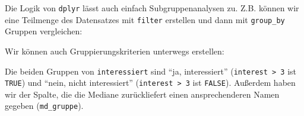 \documentclass[12pt,ngerman,]{book}
\makeatletter
\newenvironment{Shaded}{\begin{snugshade}}{\end{snugshade}}
\newcommand{\KeywordTok}[1]{\textcolor[rgb]{0.13,0.29,0.53}{\textbf{#1}}}
\newcommand{\DataTypeTok}[1]{\textcolor[rgb]{0.13,0.29,0.53}{#1}}
\newcommand{\DecValTok}[1]{\textcolor[rgb]{0.00,0.00,0.81}{#1}}
\newcommand{\StringTok}[1]{\textcolor[rgb]{0.31,0.60,0.02}{#1}}
\newcommand{\CommentTok}[1]{\textcolor[rgb]{0.56,0.35,0.01}{\textit{#1}}}
\newcommand{\OtherTok}[1]{\textcolor[rgb]{0.56,0.35,0.01}{#1}}
\newcommand{\OperatorTok}[1]{\textcolor[rgb]{0.81,0.36,0.00}{\textbf{#1}}}
\newcommand{\NormalTok}[1]{#1}
\newenvironment{kframe}{%
\medskip{}
\setlength{\fboxsep}{.8em}
 \def\at@end@of@kframe{}%
 \ifinner\ifhmode%
  \def\at@end@of@kframe{\end{minipage}}%
  \begin{minipage}{\columnwidth}%
 \fi\fi%
 \def\FrameCommand##1{\hskip\@totalleftmargin \hskip-\fboxsep
 \colorbox{shadecolor}{##1}\hskip-\fboxsep
     \hskip-\linewidth \hskip-\@totalleftmargin \hskip\columnwidth}%
 \MakeFramed {\advance\hsize-\width
   \@totalleftmargin\z@ \linewidth\hsize
   \@setminipage}}%
 {\par\unskip\endMakeFramed%
 \at@end@of@kframe}
\renewenvironment{Shaded}{\begin{kframe}}{\end{kframe}}
\theoremstyle{definition}
\theoremstyle{definition}
\theoremstyle{remark}
\makeatother
\begin{document}
Die Logik von \texttt{dplyr} lässt auch einfach Subgruppenanalysen zu.
Z.B. können wir eine Teilmenge des Datensatzes mit \texttt{filter}
erstellen und dann mit \texttt{group\_by} Gruppen vergleichen:

\begin{Shaded}
\end{Shaded}

Wir können auch Gruppierungskriterien unterwegs erstellen:

\begin{Shaded}
\end{Shaded}

Die beiden Gruppen von \texttt{interessiert} sind ``ja, interessiert''
(\texttt{interest\ \textgreater{}\ 3} ist \texttt{TRUE}) und ``nein,
nicht interessiert'' (\texttt{interest\ \textgreater{}\ 3} ist
\texttt{FALSE}). Außerdem haben wir der Spalte, die die Mediane
zurückliefert einen ansprechenderen Namen gegeben (\texttt{md\_gruppe}).
\end{document}
